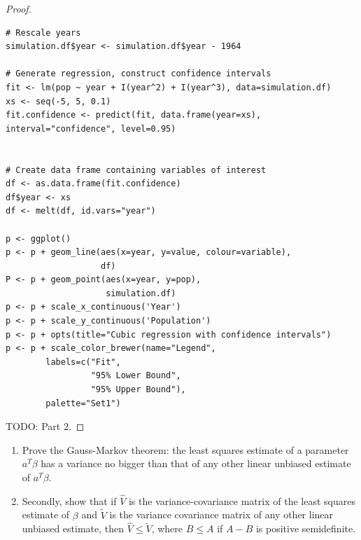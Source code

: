 \begin{proof}
\begin{lstlisting}
# Rescale years
simulation.df$year <- simulation.df$year - 1964

# Generate regression, construct confidence intervals
fit <- lm(pop ~ year + I(year^2) + I(year^3), data=simulation.df)
xs <- seq(-5, 5, 0.1)
fit.confidence <- predict(fit, data.frame(year=xs), interval="confidence", level=0.95)


# Create data frame containing variables of interest
df <- as.data.frame(fit.confidence)
df$year <- xs
df <- melt(df, id.vars="year")

p <- ggplot()
p <- p + geom_line(aes(x=year, y=value, colour=variable),
                   df)
P <- p + geom_point(aes(x=year, y=pop), 
                    simulation.df)
p <- p + scale_x_continuous('Year') 
p <- p + scale_y_continuous('Population')
p <- p + opts(title="Cubic regression with confidence intervals")
p <- p + scale_color_brewer(name="Legend",
        labels=c("Fit", 
                 "95% Lower Bound", 
                 "95% Upper Bound"), 
        palette="Set1")
\end{lstlisting}

    TODO: Part 2.
\end{proof}

\begin{exer}
    \begin{enumerate}
    \item Prove the Gauss-Markov theorem: the least squares estimate of a parameter $a^T\beta$ has a variance no bigger than that of any other linear unbiased estimate of $a^T\beta$.

    \item Secondly, show that if $\hat V$ is the variance-covariance matrix of the least squares estimate of $\beta$ and $\tilde V$ is the variance covariance matrix of any other linear unbiased estimate, then $\hat V \leq \tilde V$, where $B \leq A$ if $A - B$ is positive semidefinite.
    \end{enumerate}
\end{exer}

